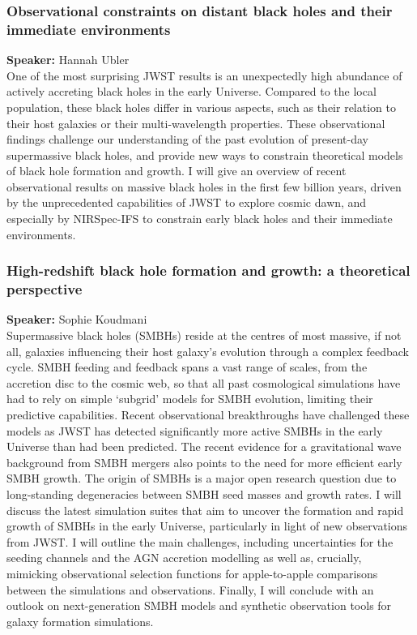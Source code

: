 \hypertarget{abs-5}{}
\subsubsection*{Observational constraints on distant black holes and their immediate environments}
\textbf{Speaker:} Hannah Ubler \invitedbadge{}\\

One of the most surprising JWST results is an unexpectedly high abundance of actively accreting black holes in the early Universe. Compared to the local population, these black holes differ in various aspects, such as their relation to their host galaxies or their multi-wavelength properties. These observational findings challenge our understanding of the past evolution of present-day supermassive black holes, and provide new ways to constrain theoretical models of black hole formation and growth. I will give an overview of recent observational results on massive black holes in the first few billion years, driven by the unprecedented capabilities of JWST to explore cosmic dawn, and especially by NIRSpec-IFS to constrain early black holes and their immediate environments.

\hypertarget{abs-6}{}
\subsubsection*{High-redshift black hole formation and growth: a theoretical perspective}
\textbf{Speaker:} Sophie Koudmani \invitedbadge{}\\

Supermassive black holes (SMBHs) reside at the centres of most massive, if not all, galaxies influencing their host galaxy’s evolution through a complex feedback cycle. SMBH feeding and feedback spans a vast range of scales, from the accretion disc to the cosmic web, so that all past cosmological simulations have had to rely on simple ‘subgrid’ models for SMBH evolution, limiting their predictive capabilities. Recent observational breakthroughs have challenged these models as JWST has detected significantly more active SMBHs in the early Universe than had been predicted. The recent evidence for a gravitational wave background from SMBH mergers also points to the need for more efficient early SMBH growth. The origin of SMBHs is a major open research question due to long-standing degeneracies between SMBH seed masses and growth rates. I will discuss the latest simulation suites that aim to uncover the formation and rapid growth of SMBHs in the early Universe, particularly in light of new observations from JWST. I will outline the main challenges, including uncertainties for the seeding channels and the AGN accretion modelling as well as, crucially, mimicking observational selection functions for apple-to-apple comparisons between the simulations and observations. Finally, I will conclude with an outlook on next-generation SMBH models and synthetic observation tools for galaxy formation simulations.

